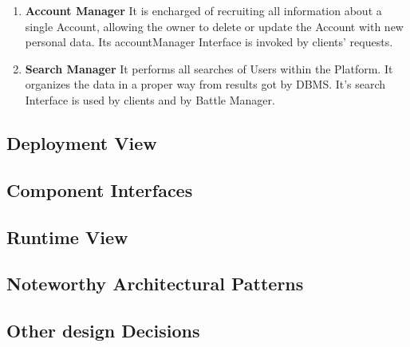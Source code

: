\begin{enumerate}
    \item \textbf{Account Manager} It is encharged of recruiting all information about a single Account, allowing the owner to delete or update the Account with new personal data. Its accountManager Interface is invoked by clients' requests.
    \item \textbf{Search Manager} It performs all searches of Users within the Platform. It organizes the data in a proper way from results got by DBMS. It's search Interface is used by clients and by Battle Manager.
\end{enumerate}
\subsection{Deployment View}
\subsection{Component Interfaces}
\subsection{Runtime View}
\subsection{Noteworthy Architectural Patterns}
\subsection{Other design Decisions}